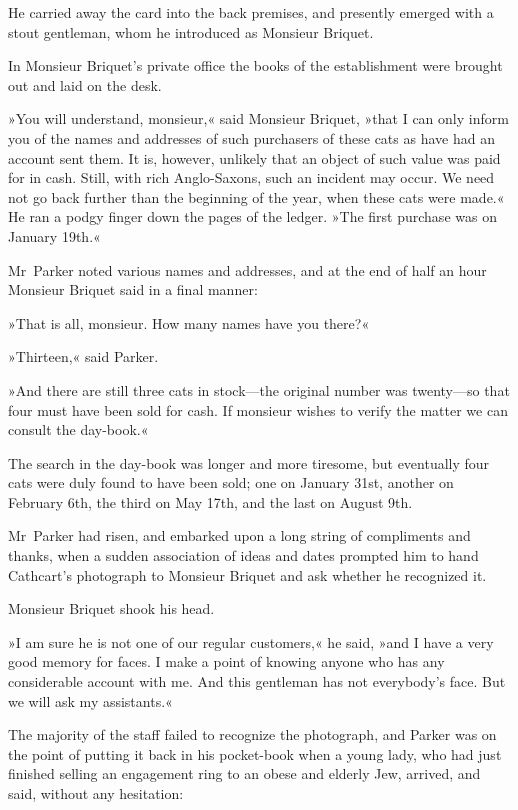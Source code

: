 He carried away the card into the back premises, and presently emerged with a stout gentleman, whom he introduced as Monsieur Briquet.

In Monsieur Briquet's private office the books of the establishment were brought out and laid on the desk.

»You will understand, monsieur,« said Monsieur Briquet, »that I can only inform you of the names and addresses of such purchasers of these cats as have had an account sent them. It is, however, unlikely that an object of such value was paid for in cash. Still, with rich Anglo-Saxons, such an incident may occur. We need not go back further than the beginning of the year, when these cats were made.« He ran a podgy finger down the pages of the ledger. »The first purchase was on January 19th.«

Mr~Parker noted various names and addresses, and at the end of half an hour Monsieur Briquet said in a final manner:

»That is all, monsieur. How many names have you there?«

»Thirteen,« said Parker.

»And there are still three cats in stock—the original number was twenty—so that four must have been sold for cash. If monsieur wishes to verify the matter we can consult the day-book.«

The search in the day-book was longer and more tiresome, but eventually four cats were duly found to have been sold; one on January 31st, another on February 6th, the third on May 17th, and the last on August 9th.

Mr~Parker had risen, and embarked upon a long string of compliments and thanks, when a sudden association of ideas and dates prompted him to hand Cathcart's photograph to Monsieur Briquet and ask whether he recognized it.

Monsieur Briquet shook his head.

»I am sure he is not one of our regular customers,« he said, »and I have a very good memory for faces. I make a point of knowing anyone who has any considerable account with me. And this gentleman has not everybody's face. But we will ask my assistants.«

The majority of the staff failed to recognize the photograph, and Parker was on the point of putting it back in his pocket-book when a young lady, who had just finished selling an engagement ring to an obese and elderly Jew, arrived, and said, without any hesitation:

